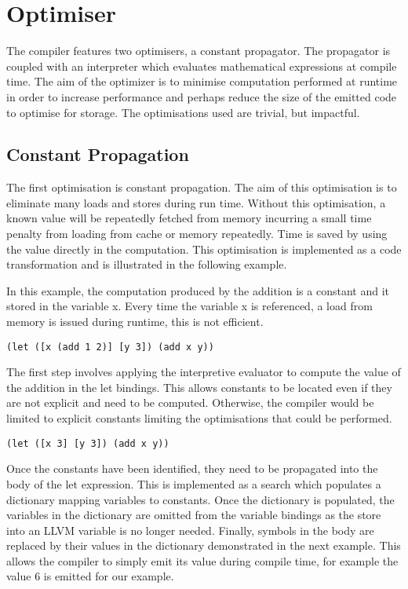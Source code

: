 \documentclass{article}
\begin{document}
\section{Optimiser}

The compiler features two optimisers, a constant propagator. The propagator is coupled with an interpreter which evaluates mathematical expressions at compile time. The aim of the optimizer is to minimise computation performed at runtime in order to increase performance and perhaps reduce the size of the emitted code to optimise for storage. The optimisations used are trivial, but impactful.

\subsection{Constant Propagation}

The first optimisation is constant propagation. The aim of this optimisation is to eliminate many loads and stores during run time. Without this optimisation, a known value will be repeatedly fetched from memory incurring a small time penalty from loading from cache or memory repeatedly. Time is saved by using the value directly in the computation. This optimisation is implemented as a code transformation and is illustrated in the following example.

In this example, the computation produced by the addition is a constant and it stored in the variable x. Every time the variable x is referenced, a load from memory is issued during runtime, this is not efficient.

\begin{verbatim}
(let ([x (add 1 2)] [y 3]) (add x y))
\end{verbatim}

The first step involves applying the interpretive evaluator to compute the value of the addition in the let bindings. This allows constants to be located even if they are not explicit and need to be computed. Otherwise, the compiler would be limited to explicit constants limiting the optimisations that could be performed. 

\begin{verbatim}
(let ([x 3] [y 3]) (add x y))
\end{verbatim}

Once the constants have been identified, they need to be propagated into the body of the let expression. This is implemented as a search which populates a dictionary mapping variables to constants. Once the dictionary is populated, the variables in the dictionary are omitted from the variable bindings as the store into an LLVM variable is no longer needed. Finally, symbols in the body are replaced by their values in the dictionary demonstrated in the next example. This allows the compiler to simply emit its value during compile time, for example the value 6 is emitted for our example.
\end{document}
